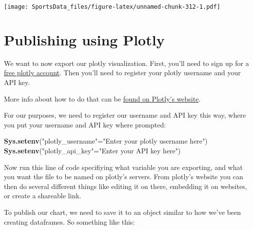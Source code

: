 \documentclass[
]{book}
\newenvironment{Shaded}{\begin{snugshade}}{\end{snugshade}}
\newcommand{\KeywordTok}[1]{\textcolor[rgb]{0.13,0.29,0.53}{\textbf{#1}}}
\newcommand{\NormalTok}[1]{#1}
\newcommand{\StringTok}[1]{\textcolor[rgb]{0.31,0.60,0.02}{#1}}
\begin{document}
\texttt{[image: SportsData\_files/figure-latex/unnamed-chunk-312-1.pdf]}

\hypertarget{publishing-using-plotly}{%
\section{Publishing using Plotly}\label{publishing-using-plotly}}

We want to now export our plotly visualization. First, you'll need to sign up for a \href{https://chart-studio.plotly.com/Auth/login/\#/}{free plotly account}. Then you'll need to register your plotly username and your API key.

More info about how to do that can be \href{https://plot.ly/r/getting-started/\#initialization-for-online-plotting}{found on Plotly's website}.

For our purposes, we need to register our username and API key this way, where you put your username and API key where prompted:

\begin{Shaded}
\begin{Highlighting}[]
\KeywordTok{Sys.setenv}\NormalTok{(}\StringTok{"plotly_username"}\NormalTok{=}\StringTok{"Enter your plotly username here"}\NormalTok{)}
\KeywordTok{Sys.setenv}\NormalTok{(}\StringTok{"plotly_api_key"}\NormalTok{=}\StringTok{"Enter your API key here"}\NormalTok{)}
\end{Highlighting}
\end{Shaded}

Now run this line of code specifiying what variable you are exporting, and what you want the file to be named on plotly's servers. From plotly's website you can then do several different things like editing it on there, embedding it on websites, or create a shareable link.

To publish our chart, we need to save it to an object similar to how we've been creating dataframes. So something like this:
\end{document}
